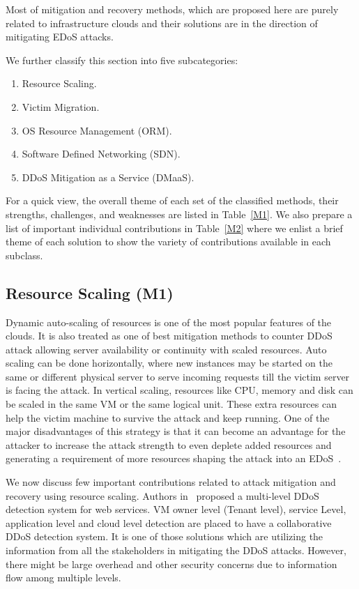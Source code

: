 \documentclass[final,5p,times,twocolumn]{elsarticle}
\begin{document}
\noindent Most of mitigation and recovery methods, which are proposed here are purely related to infrastructure clouds and their solutions are in the direction of mitigating EDoS attacks.  {We further classify this section into five subcategories:
\begin{enumerate}[1.]
\item Resource Scaling.
\item Victim Migration.
\item OS Resource Management (ORM).
\item Software Defined Networking (SDN).
\item DDoS Mitigation as a Service (DMaaS).
\end{enumerate} 
For a quick view, the overall theme of each set of the classified methods, their strengths, challenges, and weaknesses are listed in Table~\ref{M1}. We also prepare a list of important individual contributions in Table~\ref{M2} where we enlist a brief theme of each solution to show the variety of contributions available in each subclass.}
 
\subsection{Resource Scaling (M1)}

{Dynamic auto-scaling of resources is one of the most popular features of the clouds. It is also treated as one of best mitigation methods to counter DDoS attack allowing server availability or continuity with scaled resources. Auto scaling can be done horizontally, where new instances may be started on the same or different physical server to serve incoming requests till the victim server is facing the attack. In vertical scaling, resources like CPU, memory and disk can be scaled in the same VM or the same logical unit. These extra resources can help the victim machine to survive the attack and keep running. One of the major disadvantages of this strategy is that it can become an advantage for the attacker to increase the attack strength to even deplete added resources and generating a requirement of more resources shaping the attack into an EDoS~\cite{RAA}. }

We now discuss few important contributions related to attack mitigation and recovery using resource scaling. Authors in~\cite{alqahtaniddos} proposed a multi-level DDoS detection system for web services. VM owner level (Tenant level), service Level, application level and cloud level detection are placed to have a collaborative DDoS detection system. It is one of those solutions which are utilizing the information from all the stakeholders in mitigating the DDoS attacks. However, there might be large overhead and other security concerns due to information flow among multiple levels. 
\end{document}
